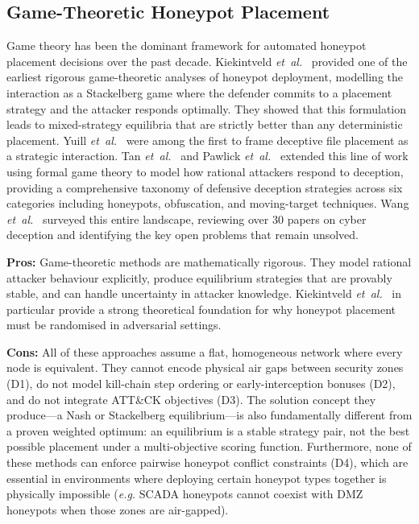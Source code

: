 \documentclass[journal]{IEEEtran}
\newcommand{\eg}{\emph{e.g.}}
\newcommand{\etal}{\emph{et~al.}}
\begin{document}
\subsection{Game-Theoretic Honeypot Placement}

Game theory has been the dominant framework for automated
honeypot placement decisions over the past decade.
Kiekintveld \etal{}~\cite{kiekintveld2015} provided one of
the earliest rigorous game-theoretic analyses of honeypot
deployment, modelling the interaction as a Stackelberg game
where the defender commits to a placement strategy and the
attacker responds optimally.
They showed that this formulation leads to mixed-strategy
equilibria that are strictly better than any deterministic
placement.
Yuill \etal{}~\cite{yuill2004} were among the first to frame
deceptive file placement as a strategic interaction.
Tan \etal{}~\cite{tan2011} and Pawlick \etal{}~\cite{pawlick2019}
extended this line of work using formal game theory to model
how rational attackers respond to deception, providing a
comprehensive taxonomy of defensive deception strategies
across six categories including honeypots, obfuscation, and
moving-target techniques.
Wang \etal{}~\cite{wang2018} surveyed this entire landscape,
reviewing over 30 papers on cyber deception and identifying
the key open problems that remain unsolved.

\textbf{Pros:} Game-theoretic methods are mathematically
rigorous. They model rational attacker behaviour explicitly,
produce equilibrium strategies that are provably stable, and
can handle uncertainty in attacker knowledge.
Kiekintveld \etal{}~\cite{kiekintveld2015} in particular
provide a strong theoretical foundation for why honeypot
placement must be randomised in adversarial settings.

\textbf{Cons:} All of these approaches assume a flat,
homogeneous network where every node is equivalent.
They cannot encode physical air gaps between security zones
(D1), do not model kill-chain step ordering or
early-interception bonuses (D2), and do not integrate
ATT\&CK objectives (D3).
The solution concept they produce---a Nash or Stackelberg
equilibrium---is also fundamentally different from a proven
weighted optimum: an equilibrium is a stable strategy pair,
not the best possible placement under a multi-objective
scoring function.
Furthermore, none of these methods can enforce pairwise
honeypot conflict constraints (D4), which are essential in
environments where deploying certain honeypot types together
is physically impossible (\eg{} SCADA honeypots cannot
coexist with DMZ honeypots when those zones are air-gapped).
\end{document}
